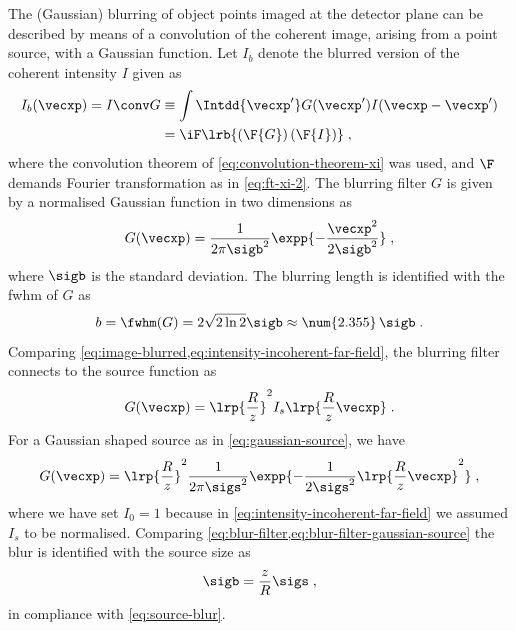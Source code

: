 \documentclass[
twoside,
openright,
titlepage,
numbers=noenddot,
headinclude,
fleqn,
a4paper,
footinclude=true,
cleardoublepage=empty,
abstractoff,
BCOR=5mm,
paper=a4,
fontsize=11pt,
british,ngerman,american,
]{scrreprt}
\begin{document}
The (Gaussian) blurring of object points imaged at the detector plane
can be described by means of a convolution of the coherent image,
arising from a point source, with a Gaussian function.  Let $I_b$
denote the blurred version of the coherent intensity $I$ given as
\begin{equation}
  \label{eq:image-blurred}
  \begin{split}
      I_b(\vecxp) = I \conv G & \equiv 
      \int\Intdd{\vecxp'} G(\vecxp') I(\vecxp-\vecxp')
      \\ & = \iF\lrb{ (\F {G})\, (\F {I})  }  \;,
  \end{split}
\end{equation}
where the convolution theorem of \cref{eq:convolution-theorem-xi} was
used, and $\F$ demands Fourier transformation as in \cref{eq:ft-xi-2}.
The blurring filter $G$ is given by a normalised Gaussian function in
two dimensions as
\begin{equation}
  \label{eq:blur-filter}
  G(\vecxp) = 
  \frac{1}{2\pi\sigb^2} \expp{-\frac{\vecxp^2}{2\sigb^2}} \;,
\end{equation}
where $\sigb$ is the standard deviation.  The blurring length is
identified with the \acf{fwhm} of $G$ as
\begin{equation}
  \label{eq:fwhm}
  b = \fwhm(G) = 2\sqrt{2\ln{2}}\sigb\approx\num{2.355}\,\sigb \;.
\end{equation}
Comparing \cref{eq:image-blurred,eq:intensity-incoherent-far-field},
the blurring filter connects to the source function as
\begin{equation}
  \label{eq:blur-filter-source-function}
    G(\vecxp) = \lrp{\frac{R}{z}}^2 I_s\lrp{\frac{R}{z}\vecxp} \;.
\end{equation}
For a Gaussian shaped source as in \cref{eq:gaussian-source}, we have
\begin{equation}
  \label{eq:blur-filter-gaussian-source}
  G(\vecxp) = 
  \lrp{\frac{R}{z}}^2\frac{1}{2\pi\sigs^2} 
  \expp{ -\frac{1}{2\sigs^2} \lrp{\frac{R}{z}\vecxp}^2 } \;,
\end{equation}
where we have set $I_0=1$ because in
\cref{eq:intensity-incoherent-far-field} we assumed $I_s$ to be
normalised.  Comparing
\cref{eq:blur-filter,eq:blur-filter-gaussian-source} the blur is
identified with the source size as
\begin{equation}
  \label{eq:sigma-blur-source}
  \sigb = \frac{z}{R}\sigs \;,
\end{equation}
in compliance with \cref{eq:source-blur}. 
\end{document}
